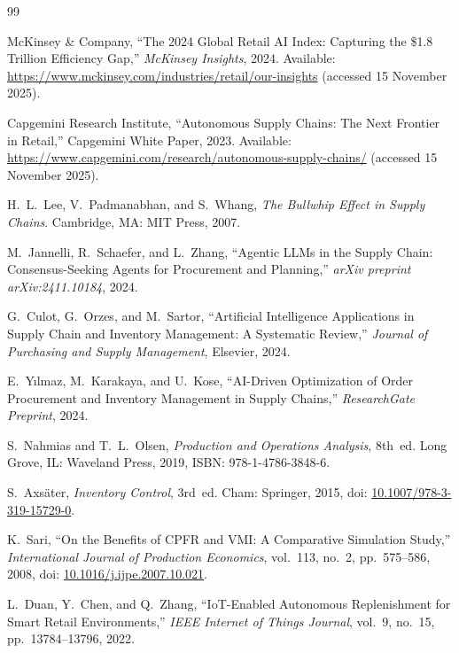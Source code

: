 \documentclass[utf8]{FrontiersinHarvard}
\begin{document}
	\medskip
	\begin{thebibliography}{99}

		McKinsey \& Company, ``The 2024 Global Retail AI Index: Capturing the
		\$1.8 Trillion Efficiency Gap,'' \emph{McKinsey Insights}, 2024.
		Available: \url{https://www.mckinsey.com/industries/retail/our-insights}
		(accessed 15 November 2025).

		Capgemini Research Institute, ``Autonomous Supply Chains: The Next
		Frontier in Retail,'' Capgemini White Paper, 2023.
		Available: \url{https://www.capgemini.com/research/autonomous-supply-chains/}
		(accessed 15 November 2025).

		H.~L.\ Lee, V.~Padmanabhan, and S.~Whang,
		\emph{The Bullwhip Effect in Supply Chains}.
		Cambridge, MA: MIT Press, 2007.

		M.~Jannelli, R.~Schaefer, and L.~Zhang,
		``Agentic LLMs in the Supply Chain: Consensus-Seeking Agents for
		Procurement and Planning,''
		\emph{arXiv preprint arXiv:2411.10184}, 2024.

		G.~Culot, G.~Orzes, and M.~Sartor,
		``Artificial Intelligence Applications in Supply Chain and Inventory
		Management: A Systematic Review,''
		\emph{Journal of Purchasing and Supply Management}, Elsevier, 2024.

		E.~Y{\i}lmaz, M.~Karakaya, and U.~Kose,
		``AI-Driven Optimization of Order Procurement and Inventory Management
		in Supply Chains,''
		\emph{ResearchGate Preprint}, 2024.

		S.~Nahmias and T.~L.\ Olsen,
		\emph{Production and Operations Analysis}, 8th~ed.
		Long Grove, IL: Waveland Press, 2019,
		ISBN: 978-1-4786-3848-6.

		S.~Axs\"{a}ter,
		\emph{Inventory Control}, 3rd~ed.
		Cham: Springer, 2015,
		doi: \href{https://doi.org/10.1007/978-3-319-15729-0}{10.1007/978-3-319-15729-0}.

		K.~Sari,
		``On the Benefits of CPFR and VMI: A Comparative Simulation Study,''
		\emph{International Journal of Production Economics},
		vol.~113, no.~2, pp.~575--586, 2008,
		doi: \href{https://doi.org/10.1016/j.ijpe.2007.10.021}{10.1016/j.ijpe.2007.10.021}.

		L.~Duan, Y.~Chen, and Q.~Zhang,
		``IoT-Enabled Autonomous Replenishment for Smart Retail Environments,''
		\emph{IEEE Internet of Things Journal},
		vol.~9, no.~15, pp.~13784--13796, 2022.


\end{thebibliography}
\end{document}
